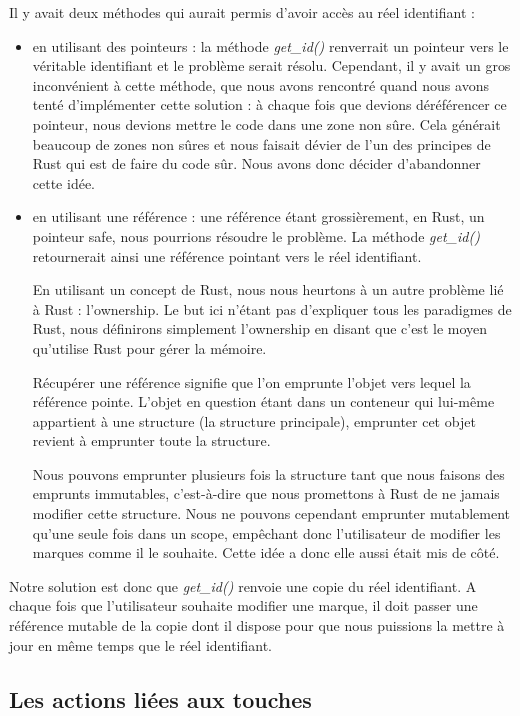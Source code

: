 \documentclass[12pt]{article}
\begin{document}
Il y avait deux méthodes qui aurait permis d'avoir accès au réel identifiant :
\begin{itemize}
\item en utilisant des pointeurs : la méthode \textit{get\_id()} renverrait un pointeur
vers le véritable identifiant et le problème serait résolu. Cependant, il y avait un gros
inconvénient à cette méthode, que nous avons rencontré quand nous avons tenté
d'implémenter cette solution : à chaque fois que devions déréférencer ce pointeur, nous
devions mettre le code dans une zone non sûre. Cela générait beaucoup de zones non sûres
et nous faisait dévier de l'un des principes de Rust qui est de faire du code sûr. Nous
avons donc décider d'abandonner
cette idée.
\item en utilisant une référence : une référence étant grossièrement, en Rust, un
pointeur safe, nous pourrions résoudre le problème. La méthode \textit{get\_id()}
retournerait ainsi une référence pointant vers le réel identifiant.

En utilisant un concept de Rust, nous nous heurtons à un autre problème lié à Rust :
l'ownership. Le but ici n'étant pas d'expliquer tous les paradigmes de Rust, nous
définirons simplement l'ownership en disant que c'est le moyen qu'utilise Rust pour gérer la mémoire.

Récupérer une référence signifie que l'on emprunte l'objet vers lequel la référence
pointe. L'objet en question étant dans un conteneur qui lui-même appartient à une
structure (la structure principale), emprunter cet objet revient à emprunter toute la
structure.

Nous pouvons emprunter plusieurs fois la structure tant que nous faisons des
emprunts immutables, c'est-à-dire que nous promettons à Rust de ne jamais modifier cette
structure. Nous ne pouvons cependant emprunter mutablement qu'une seule fois dans un scope, empêchant donc l'utilisateur de modifier les marques comme il le souhaite.
Cette idée a donc elle aussi était mis de côté.
\end{itemize}

Notre solution est donc que \textit{get\_id()} renvoie une copie du réel identifiant. A chaque
fois que l'utilisateur souhaite modifier une marque, il doit passer une référence mutable
de la copie dont il dispose pour que nous puissions la mettre à jour en même temps que
le réel identifiant.

\subsection{Les actions liées aux touches}
\end{document}
